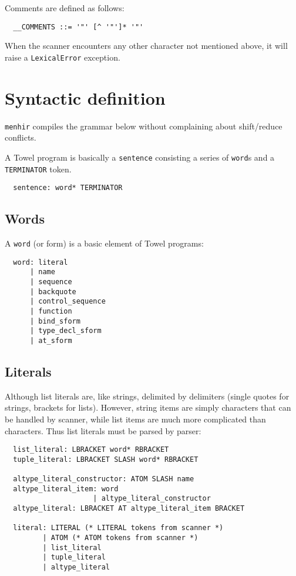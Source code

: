 \documentclass{book}
\begin{document}
Comments are defined as follows:
\begin{verbatim}
  __COMMENTS ::= '"' [^ '"']* '"'
\end{verbatim}

When the scanner encounters any other character not mentioned above, it will raise a \texttt{LexicalError} exception.

\section{Syntactic definition}

\texttt{menhir} compiles the grammar below without complaining about shift/reduce conflicts.

A Towel program is basically a \texttt{sentence} consisting a series of \texttt{word}s and a \texttt{TERMINATOR} token.
\begin{verbatim}
  sentence: word* TERMINATOR
\end{verbatim}

\subsection{Words}

A \texttt{word} (or form) is a basic element of Towel programs:
\begin{verbatim}
  word: literal
      | name
      | sequence
      | backquote
      | control_sequence
      | function
      | bind_sform
      | type_decl_sform
      | at_sform
\end{verbatim}

\subsection{Literals}

Although list literals are, like strings, delimited by delimiters (single quotes for strings, brackets for lists). However, string items are simply characters that can be handled by scanner, while list items are much more complicated than characters. Thus list literals must be parsed by parser:
\begin{verbatim}
  list_literal: LBRACKET word* RBRACKET
  tuple_literal: LBRACKET SLASH word* RBRACKET

  altype_literal_constructor: ATOM SLASH name
  altype_literal_item: word
                     | altype_literal_constructor
  altype_literal: LBRACKET AT altype_literal_item BRACKET

  literal: LITERAL (* LITERAL tokens from scanner *)
         | ATOM (* ATOM tokens from scanner *)
         | list_literal
         | tuple_literal
         | altype_literal
\end{verbatim}
\end{document}
